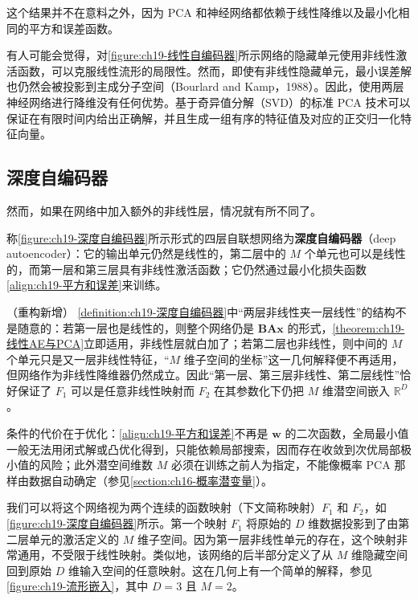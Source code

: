 \documentclass[../../main.tex]{subfiles}
\begin{document}
这个结果并不在意料之外，因为 PCA 和神经网络都依赖于线性降维以及最小化相同的平方和误差函数。

有人可能会觉得，对\cref{figure:ch19-线性自编码器}所示网络的隐藏单元使用非线性激活函数，可以克服线性流形的局限性。然而，即使有非线性隐藏单元，最小误差解也仍然会被投影到主成分子空间（Bourlard and Kamp，1988）。因此，使用两层神经网络进行降维没有任何优势。基于奇异值分解（SVD）的标准 PCA 技术可以保证在有限时间内给出正确解，并且生成一组有序的特征值及对应的正交归一化特征向量。

\subsection{深度自编码器}\label{subsection:ch19-深度自编码器}

然而，如果在网络中加入额外的非线性层，情况就有所不同了。

\begin{definition}[深度自编码器]\label{definition:ch19-深度自编码器}
称\cref{figure:ch19-深度自编码器}所示形式的四层自联想网络为\textbf{深度自编码器}（deep autoencoder）：它的输出单元仍然是线性的，第二层中的 $M$ 个单元也可以是线性的，而第一层和第三层具有非线性激活函数；它仍然通过最小化损失函数\eqref{align:ch19-平方和误差}来训练。
\end{definition}

\begin{remark}（重构新增）
\cref{definition:ch19-深度自编码器}中“两层非线性夹一层线性”的结构不是随意的：若第一层也是线性的，则整个网络仍是 $\bm{B}\bm{A}\bm{x}$ 的形式，\cref{theorem:ch19-线性AE与PCA}立即适用，非线性层就白加了；若第二层也非线性，则中间的 $M$ 个单元只是又一层非线性特征，“$M$ 维子空间的坐标”这一几何解释便不再适用，但网络作为非线性降维器仍然成立。因此“第一层、第三层非线性、第二层线性”恰好保证了 $F_1$ 可以是任意非线性映射而 $F_2$ 在其参数化下仍把 $M$ 维潜空间嵌入 $\mathbb{R}^{D}$。

条件的代价在于优化：\eqref{align:ch19-平方和误差}不再是 $\bm{w}$ 的二次函数，全局最小值一般无法用闭式解或凸优化得到，只能依赖局部搜索，因而存在收敛到次优局部极小值的风险；此外潜空间维数 $M$ 必须在训练之前人为指定，不能像概率 PCA 那样由数据自动确定（参见\cref{section:ch16-概率潜变量}）。
\end{remark}

我们可以将这个网络视为两个连续的函数映射（下文简称映射）$F_1$ 和 $F_2$，如\cref{figure:ch19-深度自编码器}所示。第一个映射 $F_1$ 将原始的 $D$ 维数据投影到了由第二层单元的激活定义的 $M$ 维子空间。因为第一层非线性单元的存在，这个映射非常通用，不受限于线性映射。类似地，该网络的后半部分定义了从 $M$ 维隐藏空间回到原始 $D$ 维输入空间的任意映射。这在几何上有一个简单的解释，参见\cref{figure:ch19-流形嵌入}，其中 $D=3$ 且 $M=2$。
\end{document}
